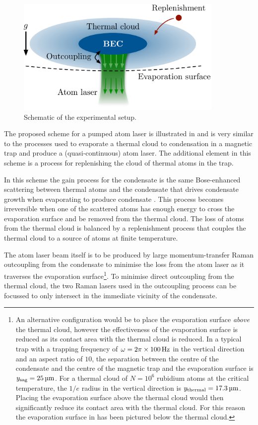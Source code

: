 \begin{figure}
    \centering
        \includegraphics[width=10cm]{QKTScheme}
    \caption{Schematic of the experimental setup.}
    \label{KineticTheory:QKTScheme}
\end{figure}

The proposed scheme for a pumped atom laser is illustrated in  and is very similar to the processes used to evaporate a thermal cloud to condensation in a magnetic trap and produce a (quasi-continuous) atom laser. The additional element in this scheme is a process for replenishing the cloud of thermal atoms in the trap.  

In this scheme the gain process for the condensate is the same Bose-enhanced scattering between thermal atoms and the condensate that drives condensate growth when evaporating to produce condensate \citep{Gardiner:1997kx,Davis:2000vn,Bijlsma:2000}.  This process becomes irreversible when one of the scattered atoms has enough energy to cross the evaporation surface and be removed from the thermal cloud.  The loss of atoms from the thermal cloud is balanced by a replenishment process that couples the thermal cloud to a source of atoms at finite temperature.

The atom laser beam itself is to be produced by large momentum-transfer Raman outcoupling from the condensate to minimise the loss from the atom laser as it traverses the evaporation surface\footnote{An alternative configuration would be to place the evaporation surface \emph{above} the thermal cloud, however the effectiveness of the evaporation surface is reduced as its contact area with the thermal cloud is reduced. In a typical trap with a trapping frequency of $\omega = 2\pi \times \unit[100]{Hz}$ in the vertical direction and an aspect ratio of $10$, the separation between the centre of the condensate and the centre of the magnetic trap and the evaporation surface is $y_\text{sag} = \unit[25]{\micro m}$.  For a thermal cloud of $N=10^6$ rubidium atoms at the critical temperature, the $1/e$ radius in the vertical direction is $y_\text{thermal} = \unit[17.3]{\micro m}$. Placing the evaporation surface above the thermal cloud would then significantly reduce its contact area with the thermal cloud. For this reason the evaporation surface in  has been pictured below the thermal cloud.}. To minimise direct outcoupling from the thermal cloud, the two Raman lasers used in the outcoupling process can be focussed to only intersect in the immediate vicinity of the condensate.

